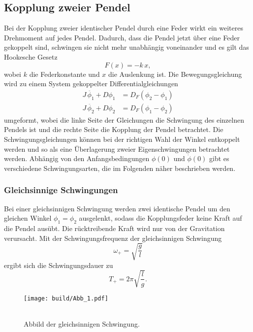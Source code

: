 \subsection{Kopplung zweier Pendel} %
\label{subsec:Schwingungen}
 Bei der Kopplung zweier identischer Pendel durch eine Feder wirkt ein weiteres Drehmoment auf jedes Pendel.
 Dadurch, dass die Pendel jetzt über eine Feder gekoppelt sind, schwingen sie nicht mehr unabhängig voneinander und es gilt das Hookesche Gesetz
 \begin{equation*}
     F(x) = -k \, x ,
 \end{equation*}
 wobei $k$ die Federkonstante und $x$ die Auslenkung ist.
 Die Bewegungsgleichung wird zu einem System gekoppelter Differentialgleichungen
 \begin{align*}
     J \, \ddot{\phi_1} + D \phi_1 &= D_F (\phi_2 - \phi_1) \\
     J \, \ddot{\phi_2} + D \phi_2 &= D_F (\phi_1 - \phi_2)
 \end{align*}
 umgeformt, wobei die linke Seite der Gleichungen die Schwingung des einzelnen Pendels ist und die rechte Seite die Kopplung der Pendel betrachtet.
 Die Schwingungsgleichungen können bei der richtigen Wahl der Winkel entkoppelt werden und so als eine Überlagerung zweier Eigenschwingungen betrachtet werden.
 Abhängig von den Anfangsbedingungen $\phi(0)$ und $\dot{\phi}(0)$ gibt es verschiedene Schwingungsarten, die im Folgenden näher beschrieben werden.

\subsubsection{Gleichsinnige Schwingungen}
\label{subsec:Gleich}
\begin{minipage}[t]{0.5\textwidth}
Bei einer gleichsinnigen Schwingung werden zwei identische Pendel um den gleichen Winkel $\phi_1 = \phi_2$ ausgelenkt, sodass die Kopplungsfeder keine Kraft auf die Pendel ausübt.
Die rücktreibende Kraft wird nur von der Gravitation verursacht.
Mit der Schwingungsfrequenz der gleichsinnigen Schwingung
\begin{equation}
    \omega_+ = \sqrt{\frac{g}{l}}
    \label{eqn:omega+}
\end{equation}
ergibt sich die Schwingungsdauer zu
\begin{equation}
    T_+ = 2 \pi \sqrt{\frac{l}{g}}.
    \label{eqn:T+}
\end{equation}
\end{minipage}
\begin{minipage}[t]{0.5\textwidth}
    \begin{figure}[H]
        \centering
        \texttt{[image: build/Abb\_1.pdf]}
\caption{\\Abbild der gleichsinnigen Schwingung. \cite{V106}}
        \label{fig:gleich}
      \end{figure}
\end{minipage}

